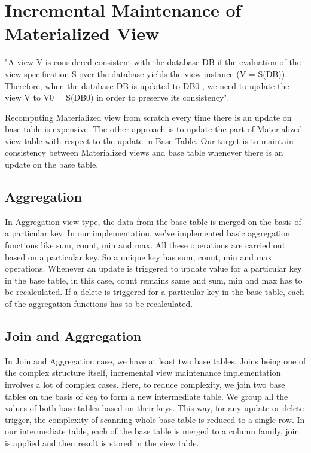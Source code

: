 \documentclass[11pt,a4paper,bibtotoc,idxtotoc,headsepline,footsepline,footexclude,BCOR12mm,DIV13]{scrbook}
\begin{document}
\section{Incremental Maintenance of Materialized View}
"A view V is considered consistent with the database DB if the evaluation of the view specification S over the database yields the view instance (V = S(DB)). Therefore, when the database DB is updated to DB0 , we need to update the view V to V0 = S(DB0) in order to preserve its consistency"\cite{incrementalmaintenance:materializedviews}. 

Recomputing Materialized view from scratch every time there is an update on base table is expensive. The other approach is to update the part of Materialized view table with respect to the update in Base Table. Our target is to maintain consistency between Materialized views and base table whenever there is an update on the base table.


\subsection{Aggregation}
In Aggregation view type, the data from the base table is merged on the basis of a particular key. In our implementation, we've implemented basic aggregation functions like sum, count, min and max. All these operations are carried out based on a particular key. So a unique key has sum, count, min and max operations. Whenever an update is triggered to update value for a particular key in the base table, in this case, count remains same and sum, min and max has to be recalculated. If a delete is triggered for a particular key in the base table, each of the aggregation functions has to be recalculated. 


\subsection{Join and Aggregation}
In Join and Aggregation case, we have at least two base tables. Joins being one of the complex structure itself, incremental view maintenance implementation involves a lot of complex cases. Here, to reduce complexity, we join two base tables on the basis of $key$ to form a new intermediate table. We group all the values of both base tables based on their keys. This way, for any update or delete trigger, the complexity of scanning whole base table is reduced to a single row. In our intermediate table, each of the base table is merged to a column family, join is applied and then result is stored in the view table. 
\end{document}
